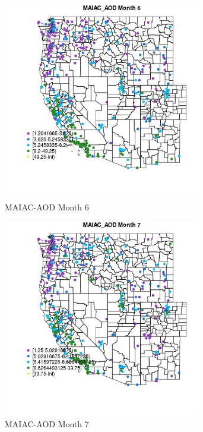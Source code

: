 \begin{figure} 
\centering  
\includegraphics[width=0.77\textwidth]{Code_Outputs/ML_input_report_ML_input_PM25_Step5_part_d_de_duplicated_aves_ML_input_MapObsMo6MAIAC_AOD.jpg} 
\caption{\label{fig:ML_input_report_ML_input_PM25_Step5_part_d_de_duplicated_aves_ML_inputMapObsMo6MAIAC_AOD}MAIAC-AOD Month 6} 
\end{figure} 
 

\begin{figure} 
\centering  
\includegraphics[width=0.77\textwidth]{Code_Outputs/ML_input_report_ML_input_PM25_Step5_part_d_de_duplicated_aves_ML_input_MapObsMo7MAIAC_AOD.jpg} 
\caption{\label{fig:ML_input_report_ML_input_PM25_Step5_part_d_de_duplicated_aves_ML_inputMapObsMo7MAIAC_AOD}MAIAC-AOD Month 7} 
\end{figure} 
 

